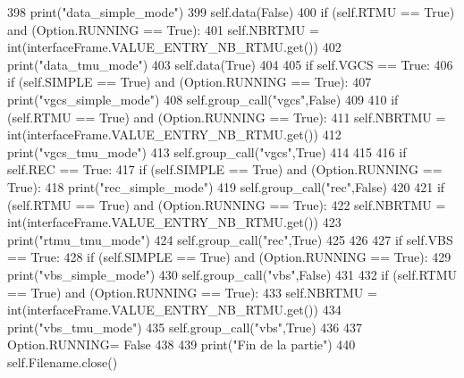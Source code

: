 \begin{DoxyCode}
398                 print(\textcolor{stringliteral}{"data\_simple\_mode"})
399                 self.data(\textcolor{keyword}{False})
400             \textcolor{keywordflow}{if} (self.RTMU == \textcolor{keyword}{True}) \textcolor{keywordflow}{and} (Option.RUNNING == \textcolor{keyword}{True}):
401                 self.NBRTMU = int(interfaceFrame.VALUE\_ENTRY\_NB\_RTMU.get())
402                 print(\textcolor{stringliteral}{"data\_tmu\_mode"})
403                 self.data(\textcolor{keyword}{True})
404 
405         \textcolor{keywordflow}{if} self.VGCS == \textcolor{keyword}{True}:
406             \textcolor{keywordflow}{if} (self.SIMPLE == \textcolor{keyword}{True}) \textcolor{keywordflow}{and} (Option.RUNNING == \textcolor{keyword}{True}):
407                 print(\textcolor{stringliteral}{"vgcs\_simple\_mode"})
408                 self.group\_call(\textcolor{stringliteral}{"vgcs"},\textcolor{keyword}{False})
409 
410             \textcolor{keywordflow}{if} (self.RTMU == \textcolor{keyword}{True}) \textcolor{keywordflow}{and} (Option.RUNNING == \textcolor{keyword}{True}):
411                 self.NBRTMU = int(interfaceFrame.VALUE\_ENTRY\_NB\_RTMU.get())
412                 print(\textcolor{stringliteral}{"vgcs\_tmu\_mode"})
413                 self.group\_call(\textcolor{stringliteral}{"vgcs"},\textcolor{keyword}{True})
414 
415 
416         \textcolor{keywordflow}{if} self.REC == \textcolor{keyword}{True}:
417             \textcolor{keywordflow}{if} (self.SIMPLE == \textcolor{keyword}{True}) \textcolor{keywordflow}{and} (Option.RUNNING == \textcolor{keyword}{True}):
418                 print(\textcolor{stringliteral}{"rec\_simple\_mode"})
419                 self.group\_call(\textcolor{stringliteral}{"rec"},\textcolor{keyword}{False})
420 
421             \textcolor{keywordflow}{if} (self.RTMU == \textcolor{keyword}{True}) \textcolor{keywordflow}{and} (Option.RUNNING == \textcolor{keyword}{True}):
422                 self.NBRTMU = int(interfaceFrame.VALUE\_ENTRY\_NB\_RTMU.get())
423                 print(\textcolor{stringliteral}{"rtmu\_tmu\_mode"})
424                 self.group\_call(\textcolor{stringliteral}{"rec"},\textcolor{keyword}{True})
425 
426 
427         \textcolor{keywordflow}{if} self.VBS == \textcolor{keyword}{True}:
428             \textcolor{keywordflow}{if} (self.SIMPLE == \textcolor{keyword}{True}) \textcolor{keywordflow}{and} (Option.RUNNING == \textcolor{keyword}{True}):
429                 print(\textcolor{stringliteral}{"vbs\_simple\_mode"})
430                 self.group\_call(\textcolor{stringliteral}{"vbs"},\textcolor{keyword}{False})
431 
432             \textcolor{keywordflow}{if} (self.RTMU == \textcolor{keyword}{True}) \textcolor{keywordflow}{and} (Option.RUNNING == \textcolor{keyword}{True}):
433                 self.NBRTMU = int(interfaceFrame.VALUE\_ENTRY\_NB\_RTMU.get())
434                 print(\textcolor{stringliteral}{"vbs\_tmu\_mode"})
435                 self.group\_call(\textcolor{stringliteral}{"vbs"},\textcolor{keyword}{True})
436 
437         Option.RUNNING= \textcolor{keyword}{False}
438 
439         print(\textcolor{stringliteral}{"Fin de la partie"})
440         self.Filename.close()
\end{DoxyCode}



